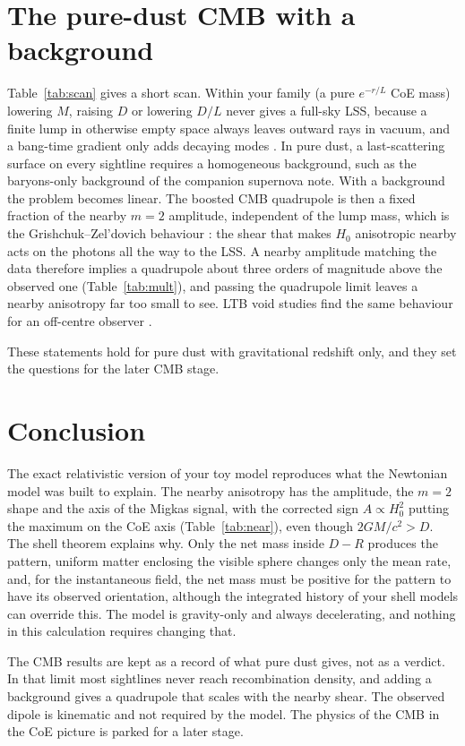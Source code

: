 \documentclass[10pt,twocolumn,letterpaper]{article}
\begin{document}
\section{The pure-dust CMB with a background}
Table~\ref{tab:scan} gives a short scan. Within your family (a pure $e^{-r/L}$ CoE mass) lowering $M$, raising $D$ or lowering $D/L$ never gives a full-sky LSS, because a finite lump in otherwise empty space always leaves outward rays in vacuum, and a bang-time gradient only adds decaying modes \cite{Clarkson2011}. In pure dust, a last-scattering surface on every sightline requires a homogeneous background, such as the baryons-only background of the companion supernova note. With a background the problem becomes linear. The boosted CMB quadrupole is then a fixed fraction of the nearby $m=2$ amplitude, independent of the lump mass, which is the Grishchuk--Zel'dovich behaviour \cite{GZ1978,Turner1991,Erickcek2008}: the shear that makes $H_0$ anisotropic nearby acts on the photons all the way to the LSS. A nearby amplitude matching the data therefore implies a quadrupole about three orders of magnitude above the observed one (Table~\ref{tab:mult}), and passing the quadrupole limit leaves a nearby anisotropy far too small to see. LTB void studies find the same behaviour for an off-centre observer \cite{Alnes2006,Foreman2010,Enqvist2008,Clarkson2012}.


These statements hold for pure dust with gravitational redshift only, and they set the questions for the later CMB stage.

\section{Conclusion}
The exact relativistic version of your toy model reproduces what the Newtonian model was built to explain. The nearby anisotropy has the amplitude, the $m=2$ shape and the axis of the Migkas signal, with the corrected sign $A\propto H_0^2$ putting the maximum on the CoE axis (Table~\ref{tab:near}), even though $2GM/c^2>D$. The shell theorem explains why. Only the net mass inside $D-R$ produces the pattern, uniform matter enclosing the visible sphere changes only the mean rate, and, for the instantaneous field, the net mass must be positive for the pattern to have its observed orientation, although the integrated history of your shell models can override this. The model is gravity-only and always decelerating, and nothing in this calculation requires changing that.

The CMB results are kept as a record of what pure dust gives, not as a verdict. In that limit most sightlines never reach recombination density, and adding a background gives a quadrupole that scales with the nearby shear. The observed dipole is kinematic and not required by the model. The physics of the CMB in the CoE picture is parked for a later stage.
\end{document}
